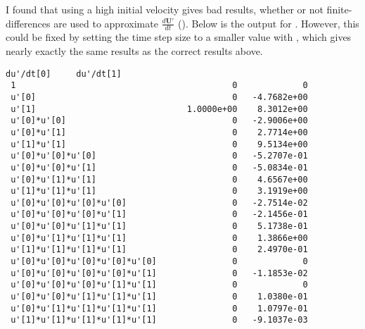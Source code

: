\documentclass{article}
\let\vec\mathbf
\def\lstinline#1{}%
\begin{document}
I found that using a high initial velocity \lstinline{-v0 -2} gives bad results,
whether or not finite-differences are used to approximate $\frac{d\vec{U'}}{dt}$
(\lstinline{-fd_der}). Below is the output for \lstinline{./pendulum -v0 -2 -fd_der}.
However, this could be fixed by setting the time step size to a
smaller value with \lstinline{-dt 0.001}, which gives nearly exactly the same
results as the correct results above.
\begin{lstlisting}[language={}]
                                    du'/dt[0]     du'/dt[1]
 1                                           0             0
 u'[0]                                       0   -4.7682e+00
 u'[1]                              1.0000e+00    8.3012e+00
 u'[0]*u'[0]                                 0   -2.9006e+00
 u'[0]*u'[1]                                 0    2.7714e+00
 u'[1]*u'[1]                                 0    9.5134e+00
 u'[0]*u'[0]*u'[0]                           0   -5.2707e-01
 u'[0]*u'[0]*u'[1]                           0   -5.0834e-01
 u'[0]*u'[1]*u'[1]                           0    4.6567e+00
 u'[1]*u'[1]*u'[1]                           0    3.1919e+00
 u'[0]*u'[0]*u'[0]*u'[0]                     0   -2.7514e-02
 u'[0]*u'[0]*u'[0]*u'[1]                     0   -2.1456e-01
 u'[0]*u'[0]*u'[1]*u'[1]                     0    5.1738e-01
 u'[0]*u'[1]*u'[1]*u'[1]                     0    1.3866e+00
 u'[1]*u'[1]*u'[1]*u'[1]                     0    2.4970e-01
 u'[0]*u'[0]*u'[0]*u'[0]*u'[0]               0             0
 u'[0]*u'[0]*u'[0]*u'[0]*u'[1]               0   -1.1853e-02
 u'[0]*u'[0]*u'[0]*u'[1]*u'[1]               0             0
 u'[0]*u'[0]*u'[1]*u'[1]*u'[1]               0    1.0380e-01
 u'[0]*u'[1]*u'[1]*u'[1]*u'[1]               0    1.0797e-01
 u'[1]*u'[1]*u'[1]*u'[1]*u'[1]               0   -9.1037e-03
\end{lstlisting}
\end{document}
